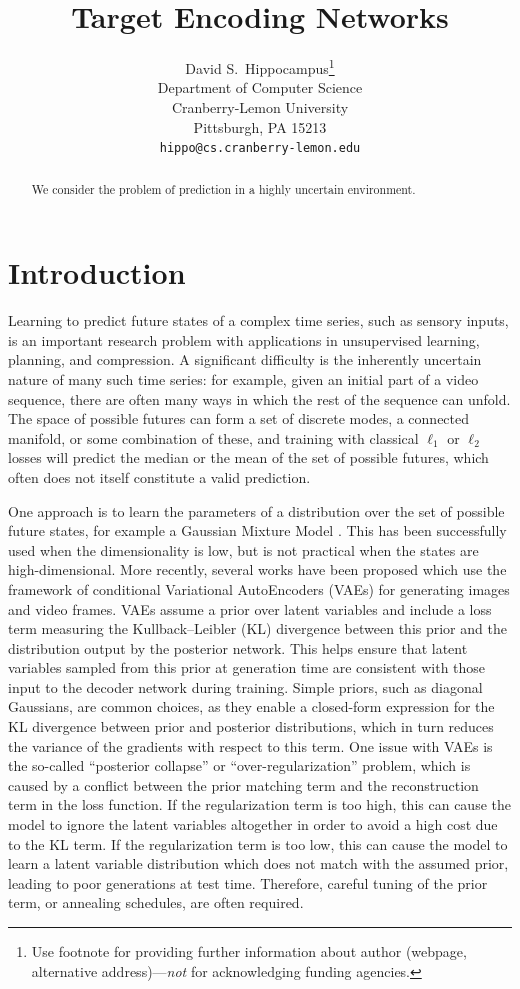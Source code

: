 \documentclass{article}
\title{Target Encoding Networks}
\author{
  David S.~Hippocampus\thanks{Use footnote for providing further
    information about author (webpage, alternative
    address)---\emph{not} for acknowledging funding agencies.} \\
  Department of Computer Science\\
  Cranberry-Lemon University\\
  Pittsburgh, PA 15213 \\
  \texttt{hippo@cs.cranberry-lemon.edu} \\
}
\begin{document}

\maketitle

\begin{abstract}
  We consider the problem of prediction in a highly uncertain environment.
\end{abstract}


\section{Introduction}

Learning to predict future states of a complex time series, such as sensory inputs, is an important research problem with applications in unsupervised learning, planning, and compression.
A significant difficulty is the inherently uncertain nature of many such time series: for example, given an initial part of a video sequence, there are often many ways in which the rest of the sequence can unfold.
The space of possible futures can form a set of discrete modes, a connected manifold, or some combination of these, and training with classical $\ell_1$ or $\ell_2$ losses will predict the median or the mean of the set of possible futures, which often does not itself constitute a valid prediction.

One approach is to learn the parameters of a distribution over the set of possible future states, for example a Gaussian Mixture Model \citep{mixture-density-networks}.
This has been successfully used when the dimensionality is low, but is not practical when the states are high-dimensional.
More recently, several works have been proposed which use the framework of conditional Variational AutoEncoders (VAEs) for generating images and video frames.
VAEs assume a prior over latent variables and include a loss term measuring the Kullback–Leibler (KL) divergence between this prior and the distribution output by the posterior network.
This helps ensure that latent variables sampled from this prior at generation time are consistent with those input to the decoder network during training.
Simple priors, such as diagonal Gaussians, are common choices, as they enable a closed-form expression for the KL divergence between prior and posterior distributions, which in turn reduces the variance of the gradients with respect to this term.
One issue with VAEs is the so-called ``posterior collapse'' or ``over-regularization'' problem, which is caused by a conflict between the prior matching term and the reconstruction term in the loss function. If the regularization term is too high, this can cause the model to ignore the latent variables altogether in order to avoid a high cost due to the KL term. If the regularization term is too low, this can cause the model to learn a latent variable distribution which does not match with the assumed prior, leading to poor generations at test time.
Therefore, careful tuning of the prior term, or annealing schedules, are often required.
\end{document}
